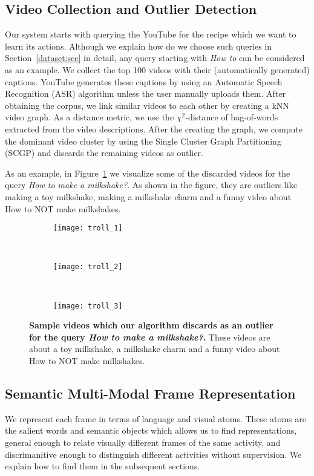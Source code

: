 \subsection{Video Collection and Outlier Detection}
\label{filter}
Our system starts with querying the YouTube for the recipe which we want to learn its actions. Although we explain how do we choose such queries in Section~\ref{dataset:sec} in detail, any query starting with \emph{How to} can be considered as an example. We collect the top 100 videos with their (automatically generated) captions. YouTube generates these captions by using an Automatic Speech Recognition (ASR) algorithm unless the user manually uploads them. After obtaining the corpus, we link similar videos to each other by creating a kNN video graph. As a distance metric, we use the $\chi^2$-distance of bag-of-words extracted from the video descriptions. After the creating the graph, we compute the dominant video cluster by using the Single Cluster Graph Partitioning (SCGP)\cite{scgp} and discards the remaining videos as outlier.

As an example, in Figure~\ref{outliers} we visualize some of the discarded videos for the query \emph{How to make a milkshake?}. As shown in the figure, they are outliers like making a toy milkshake, making a milkshake charm and a funny video about How to NOT make milkshakes.
\begin{figure}[ht]
  \begin{subfigure}[b]{0.16\textwidth}
    \texttt{[image: troll\_1]}
  \end{subfigure}~
  \begin{subfigure}[b]{0.16\textwidth}
    \texttt{[image: troll\_2]}
  \end{subfigure}~
  \begin{subfigure}[b]{0.16\textwidth}
    \texttt{[image: troll\_3]}
  \end{subfigure}
\caption{\textbf{Sample videos which our algorithm discards as an outlier for the query \emph{How to make a milkshake?}.} These videos are about a toy milkshake, a milkshake charm and a funny video about How to NOT make milkshakes.}
\label{outliers}
\end{figure}

\subsection{Semantic Multi-Modal Frame Representation}
We represent each frame in terms of language and visual atoms. These atoms are the salient words and semantic objects which allows us to find representations, general enough to relate visually different frames of the same activity, and discrimanitive enough to distinguish different activities without supervision. We explain how to find them in the subsequent sections.

